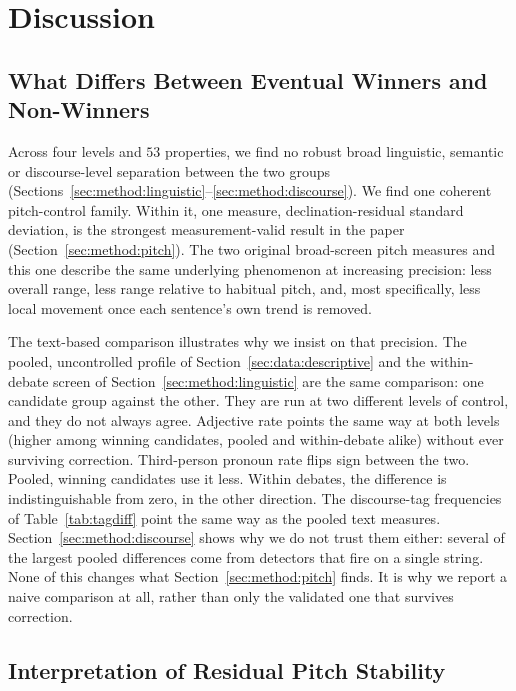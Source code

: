 \documentclass[pdflatex,sn-mathphys-num]{sn-jnl}%
\begin{document}
\section{Discussion}
\label{sec:disc}

\subsection{What Differs Between Eventual Winners and Non-Winners}
\label{sec:disc:whatdiffers}

Across four levels and $53$ properties, we find no robust broad linguistic,
semantic or discourse-level separation between the two groups
(Sections~\ref{sec:method:linguistic}--\ref{sec:method:discourse}). We find
one coherent pitch-control family. Within it, one measure,
declination-residual standard deviation, is the
strongest measurement-valid result in the paper (Section~\ref{sec:method:pitch}). The
two original broad-screen pitch measures and this one describe the same
underlying phenomenon at increasing precision: less overall range, less
range relative to habitual pitch, and, most specifically, less local
movement once each sentence's own trend is removed.

The text-based comparison illustrates why we insist on that precision. The
pooled, uncontrolled profile of Section~\ref{sec:data:descriptive} and the
within-debate screen of Section~\ref{sec:method:linguistic} are the same
comparison: one candidate group against the other. They are run at two
different levels of control, and they do not always agree. Adjective rate points the
same way at both levels (higher among winning candidates, pooled and
within-debate alike) without ever surviving correction. Third-person
pronoun rate flips sign between the two. Pooled, winning candidates use it
less. Within debates, the difference is indistinguishable from zero, in the
other direction. The discourse-tag frequencies of
Table~\ref{tab:tagdiff} point the same way as the pooled text
measures. Section~\ref{sec:method:discourse} shows why we do not trust
them either: several of the largest pooled differences come from detectors
that fire on a single string. None of this changes what Section~\ref{sec:method:pitch}
finds. It is why we report a naive comparison at all, rather than only the
validated one that survives correction.

\subsection{Interpretation of Residual Pitch Stability}
\label{sec:disc:mechanism}
\end{document}
